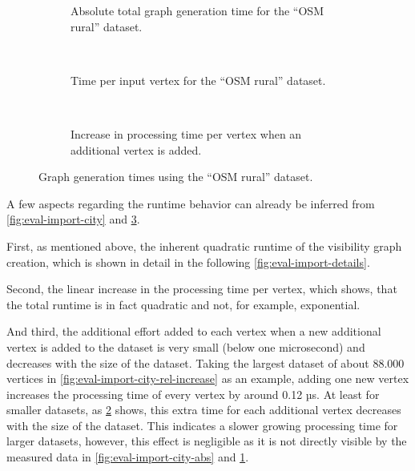 \begin{figure}[h]
\begin{minipage}{.48\textwidth}
\begin{subfigure}[t]{\linewidth}
\begin{figcenter}
						
					\end{figcenter}
					\caption{Absolute total graph generation time for the \enquote{OSM rural} dataset.}
					\label{fig:eval-import-rural-abs}
				\end{subfigure}
				\\[3ex]
				\begin{subfigure}[t]{\linewidth}
					\begin{figcenter}
						
					\end{figcenter}
					\caption{Time per input vertex for the \enquote{OSM rural} dataset.}
				\end{subfigure}
				\\[3ex]
				\begin{subfigure}[t]{\linewidth}
					\begin{figcenter}
						
					\end{figcenter}
					\caption{Increase in processing time per vertex when an additional vertex is added.}
					\label{fig:eval-import-rural-rel-increase}
				\end{subfigure}
				\caption{Graph generation times using the \enquote{OSM rural} dataset.}
				\label{fig:eval-import-rural}
			\end{minipage}
		\end{figure}
		
		A few aspects regarding the runtime behavior can already be inferred from \cref{fig:eval-import-city} and \cref{fig:eval-import-rural}.
		
		First, as mentioned above, the inherent quadratic runtime of the visibility graph creation, which is shown in detail in the following \cref{fig:eval-import-details}.
		
		Second, the linear increase in the processing time per vertex, which shows, that the total runtime is in fact quadratic and not, for example, exponential.
		
		And third, the additional effort added to each vertex when a new additional vertex is added to the dataset is very small (below one microsecond) and decreases with the size of the dataset.
		Taking the largest dataset of about 88.000 vertices in \cref{fig:eval-import-city-rel-increase} as an example, adding one new vertex increases the processing time of every vertex by around 0.12 µs.
		At least for smaller datasets, as \cref{fig:eval-import-rural-rel-increase} shows, this extra time for each additional vertex decreases with the size of the dataset.
		This indicates a slower growing processing time for larger datasets, however, this effect is negligible as it is not directly visible by the measured data in \cref{fig:eval-import-city-abs} and \cref{fig:eval-import-rural-abs}.
		
